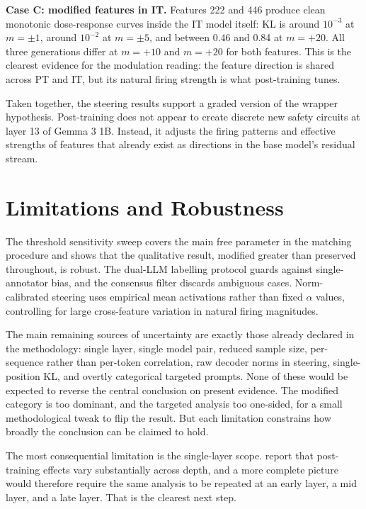 \textbf{Case C: modified features in IT.} Features 222 and 446 produce clean monotonic dose-response curves inside the IT model itself: KL is around $10^{-3}$ at $m = \pm 1$, around $10^{-2}$ at $m = \pm 5$, and between 0.46 and 0.84 at $m = +20$. All three generations differ at $m = +10$ and $m = +20$ for both features. This is the clearest evidence for the modulation reading: the feature direction is shared across PT and IT, but its natural firing strength is what post-training tunes.

Taken together, the steering results support a graded version of the wrapper hypothesis. Post-training does not appear to create discrete new safety circuits at layer 13 of Gemma 3 1B. Instead, it adjusts the firing patterns and effective strengths of features that already exist as directions in the base model's residual stream.

\section{Limitations and Robustness}
\label{sec:limitations-robustness}

The threshold sensitivity sweep covers the main free parameter in the matching procedure and shows that the qualitative result, modified greater than preserved throughout, is robust. The dual-LLM labelling protocol guards against single-annotator bias, and the consensus filter discards ambiguous cases. Norm-calibrated steering uses empirical mean activations rather than fixed $\alpha$ values, controlling for large cross-feature variation in natural firing magnitudes.

The main remaining sources of uncertainty are exactly those already declared in the methodology: single layer, single model pair, reduced sample size, per-sequence rather than per-token correlation, raw decoder norms in steering, single-position KL, and overtly categorical targeted prompts. None of these would be expected to reverse the central conclusion on present evidence. The modified category is too dominant, and the targeted analysis too one-sided, for a small methodological tweak to flip the result. But each limitation constrains how broadly the conclusion can be claimed to hold.

The most consequential limitation is the single-layer scope. \textcite{du_how_2025} report that post-training effects vary substantially across depth, and a more complete picture would therefore require the same analysis to be repeated at an early layer, a mid layer, and a late layer. That is the clearest next step.

